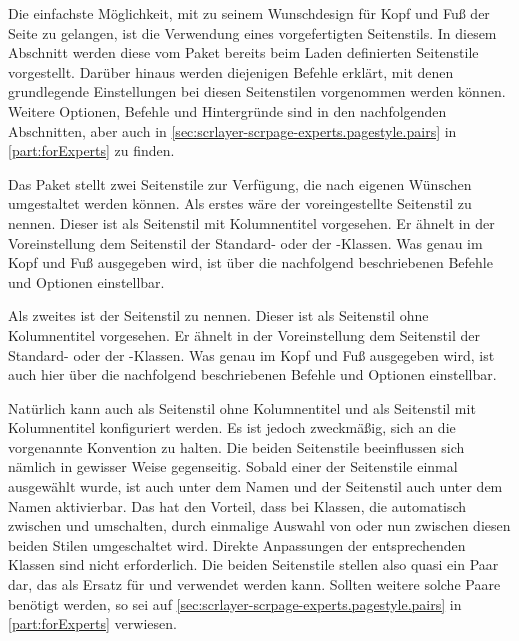 Die einfachste Möglichkeit, mit  zu seinem
Wunschdesign für Kopf und Fuß der Seite zu gelangen, ist die Verwendung eines
vorgefertigten Seitenstils.
%
\iftrue %
  In diesem Abschnitt werden diese vom Paket  bereits
  beim Laden definierten Seitenstile vorgestellt. Darüber hinaus werden
  diejenigen Befehle erklärt, mit denen grundlegende Einstellungen bei diesen
  Seitenstilen vorgenommen werden können. Weitere Optionen, Befehle und
  Hintergründe sind in den nachfolgenden Abschnitten, aber auch in
  \autoref{sec:scrlayer-scrpage-experts.pagestyle.pairs} in
  \autoref{part:forExperts} zu finden.%
\fi

\begin{Declaration}
\end{Declaration}
Das Paket  stellt zwei Seitenstile zur Verfügung,
die nach eigenen Wünschen umgestaltet werden
können. Als erstes wäre der voreingestellte
Seitenstil  zu
nennen. Dieser ist als Seitenstil mit Kolumnentitel vorgesehen. Er ähnelt in
der Voreinstellung dem Seitenstil
 der Standard-
oder der \KOMAScript-Klassen. Was genau im Kopf und Fuß ausgegeben wird, ist
über die nachfolgend beschriebenen Befehle und Optionen einstellbar.

Als zweites ist der Seitenstil
 zu
nennen. Dieser ist als Seitenstil ohne Kolumnentitel vorgesehen. Er ähnelt in
der Voreinstellung dem Seitenstil
 der Standard- oder der
\KOMAScript-Klassen. Was genau im Kopf und Fuß ausgegeben wird, ist auch hier
über die nachfolgend beschriebenen Befehle und Optionen einstellbar.

Natürlich kann auch  als Seitenstil ohne Kolumnentitel
und  als Seitenstil mit Kolumnentitel
konfiguriert werden. Es ist jedoch zweckmäßig, sich an die vorgenannte
Konvention zu halten. Die beiden Seitenstile beeinflussen sich nämlich in
gewisser Weise gegenseitig. Sobald einer der Seitenstile einmal ausgewählt
wurde, ist  auch unter dem Namen
%
 und der Seitenstil
 auch unter dem Namen
%
 aktivierbar. Das hat den Vorteil, dass bei
Klassen, die automatisch zwischen  und 
umschalten, durch einmalige Auswahl von  oder
 nun zwischen diesen beiden Stilen umgeschaltet
wird. Direkte Anpassungen der entsprechenden Klassen sind nicht
erforderlich. Die beiden Seitenstile stellen also quasi ein Paar dar, das als
Ersatz für  und  verwendet werden
kann. Sollten weitere solche Paare benötigt werden, so sei auf
\autoref{sec:scrlayer-scrpage-experts.pagestyle.pairs} in
\autoref{part:forExperts} verwiesen.%
\EndIndexGroup


